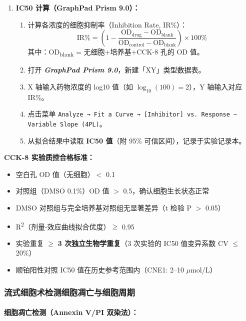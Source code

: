 \documentclass[12pt,a4paper,twoside]{article}
\newcommand{\software}[1]{\textbf{\textit{#1}}}
\newcommand{\clickpath}[1]{\texttt{#1}}
\begin{document}
\begin{enumerate}
  \item \textbf{IC50 计算（GraphPad Prism 9.0）：}
    \begin{enumerate}
      \item 计算各浓度的细胞抑制率（Inhibition Rate, IR\%）：
        \[ \text{IR\%} = \left(1 - \frac{\text{OD}_{\text{drug}} - \text{OD}_{\text{blank}}}{\text{OD}_{\text{control}} - \text{OD}_{\text{blank}}}\right) \times 100\% \]
        其中：OD\textsubscript{blank} = 无细胞+培养基+CCK-8 孔的 OD 值。
      \item 打开 \software{GraphPad Prism 9.0}，新建「XY」类型数据表。
      \item X 轴输入药物浓度的 log10 值（如 $\log_{10}(100) = 2$），Y 轴输入对应 IR\%。
      \item 点击菜单 \clickpath{Analyze → Fit a Curve → [Inhibitor] vs. Response -- Variable Slope (4PL)}。
      \item 从拟合结果中读取 \textbf{IC50 值}（附 95\% 可信区间），记录于实验记录本。
    \end{enumerate}
\end{enumerate}

\begin{qcbox}
\textbf{CCK-8 实验质控合格标准：}
\begin{itemize}
  \item 空白孔 OD 值（无细胞）$<$ 0.1 
  \item 对照组（DMSO 0.1\%）OD 值 $>$ 0.5，确认细胞生长状态正常 
  \item DMSO 对照组与完全培养基对照组无显著差异（t 检验 P $>$ 0.05）
  \item R\textsuperscript{2}（剂量-效应曲线拟合优度）$\geq$ 0.95 
  \item 实验重复 $\geq$ \textbf{3 次独立生物学重复}（3 次实验的 IC50 值变异系数 CV $\leq$ 20\%）
  \item 顺铂阳性对照 IC50 值在历史参考范围内（CNE1: 2--10 $\mu$mol/L）
\end{itemize}
\end{qcbox}

\subsubsection{流式细胞术检测细胞凋亡与细胞周期}

\paragraph{细胞凋亡检测（Annexin V/PI 双染法）：}
\end{document}
